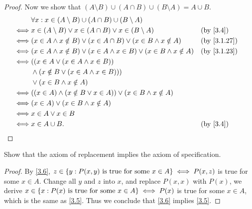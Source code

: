 \begin{proof}
  Now we show that \((A \setminus B) \cup (A \cap B) \cup (B \setminus A) = A \cup B\).
  \begin{align*}
         & \forall x : x \in (A \setminus B) \cup (A \cap B) \cup (B \setminus A)                                              \\
    \iff & x \in (A \setminus B) \lor x \in (A \cap B) \lor x \in (B \setminus A)                  &  & \text{(by \cref{3.4})} \\
    \iff & (x \in A \land x \notin B) \lor (x \in A \cap B) \lor (x \in B \land x \notin A)        &  & \by{3.1.27}            \\
    \iff & (x \in A \land x \notin B) \lor (x \in A \land x \in B) \lor (x \in B \land x \notin A) &  & \by{3.1.23}            \\
    \iff & ((x \in A \lor (x \in A \land x \in B))                                                                             \\
         & \land (x \notin B \lor (x \in A \land x \in B)))                                                                    \\
         & \lor (x \in B \land x \notin A)                                                                                     \\
    \iff & ((x \in A) \land (x \notin B \lor x \in A)) \lor (x \in B \land x \notin A)                                         \\
    \iff & (x \in A) \lor (x \in B \land x \notin A)                                                                           \\
    \iff & x \in A \lor x \in B                                                                                                \\
    \iff & x \in A \cup B.                                                                         &  & \text{(by \cref{3.4})}
  \end{align*}
\end{proof}

\begin{ex}\label{ex:3.1.11}
  Show that the axiom of replacement implies the axiom of specification.
\end{ex}

\begin{proof}
  By \cref{3.6}, \(z \in \left\lbrace y : P(x, y) \text{ is true for some } x \in A\right\rbrace \iff P(x, z)\) is true for some \(x \in A\).
  Change all \(y\) and \(z\) into \(x\), and replace \(P(x, x)\) with \(P(x)\), we derive \(x \in \left\lbrace x : P(x) \text{ is true for some } x \in A\right\rbrace \iff P(x)\) is true for some \(x \in A\), which is the same as \cref{3.5}.
  Thus we conclude that \cref{3.6} implies \cref{3.5}.
\end{proof}